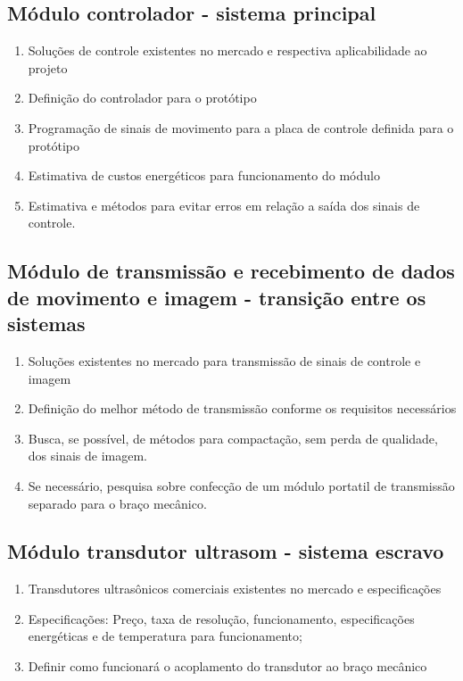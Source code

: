 \documentclass[a4paper]{article}
\begin{document}
\subsection{Módulo controlador - sistema principal}

\begin{enumerate}
\item Soluções de controle existentes no mercado e respectiva aplicabilidade ao projeto
\item Definição do controlador para o protótipo
\item Programação de sinais de movimento para a placa de controle definida para o protótipo
\item Estimativa de custos energéticos para funcionamento do módulo
\item Estimativa e métodos para evitar erros em relação a saída dos sinais de controle.
\end{enumerate}

\subsection{Módulo de transmissão e recebimento de dados de movimento e imagem - transição entre os sistemas}

\begin{enumerate}
\item Soluções existentes no mercado para transmissão de sinais de controle e imagem
\item Definição do melhor método de transmissão conforme os requisitos necessários
\item Busca, se possível, de métodos para compactação, sem perda de qualidade, dos sinais de imagem.
\item Se necessário, pesquisa sobre confecção de um módulo portatil de transmissão separado para o braço mecânico.
\end{enumerate}

\subsection{Módulo transdutor ultrasom - sistema escravo}

\begin{enumerate}
\item Transdutores ultrasônicos comerciais existentes no mercado e especificações
\item Especificações: Preço, taxa de resolução, funcionamento, especificações energéticas e de temperatura para funcionamento;
\item Definir como funcionará o acoplamento do transdutor ao braço mecânico
\end{enumerate}
\end{document}
